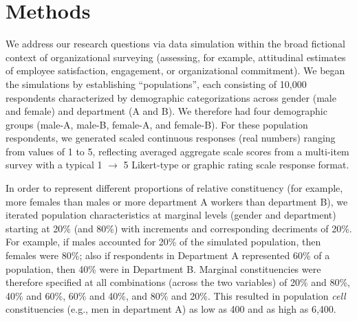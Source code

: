 \documentclass[
  ,man,floatsintext]{apa6}
\begin{document}
\hypertarget{methods}{%
\section{Methods}\label{methods}}

We address our research questions via data simulation within the broad fictional context of organizational surveying (assessing, for example, attitudinal estimates of employee satisfaction, engagement, or organizational commitment). We began the simulations by establishing ``populations'', each consisting of 10,000 respondents characterized by demographic categorizations across gender (male and female) and department (A and B). We therefore had four demographic groups (male-A, male-B, female-A, and female-B). For these population respondents, we generated scaled continuous responses (real numbers) ranging from values of 1 to 5, reflecting averaged aggregate scale scores from a multi-item survey with a typical 1 \(\rightarrow\) 5 Likert-type or graphic rating scale response format.

In order to represent different proportions of relative constituency (for example, more females than males or more department A workers than department B), we iterated population characteristics at marginal levels (gender and department) starting at 20\% (and 80\%) with increments and corresponding decriments of 20\%. For example, if males accounted for 20\% of the simulated population, then females were 80\%; also if respondents in Department A represented 60\% of a population, then 40\% were in Department B. Marginal constituencies were therefore specified at all combinations (across the two variables) of 20\% and 80\%, 40\% and 60\%, 60\% and 40\%, and 80\% and 20\%. This resulted in population \emph{cell} constituencies (e.g., men in department A) as low as 400 and as high as 6,400.
\end{document}
